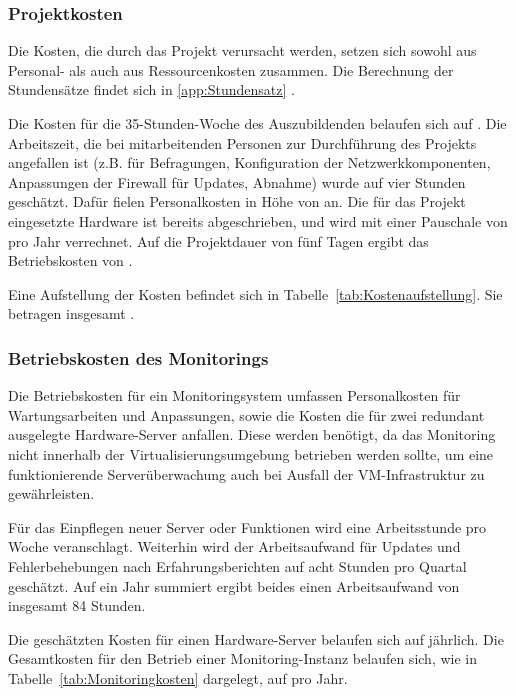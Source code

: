 \subsubsection{Projektkosten}
\label{sec:Projektkosten}
Die Kosten, die durch das Projekt verursacht werden, setzen sich sowohl aus Personal- als auch aus Ressourcenkosten zusammen. Die Berechnung der Stundensätze findet sich in \ref{app:Stundensatz} .

Die Kosten für die 35-Stunden-Woche des Auszubildenden belaufen sich auf . Die Arbeitszeit, die bei mitarbeitenden Personen zur Durchführung des Projekts angefallen ist (z.B. für Befragungen, Konfiguration der Netzwerkkomponenten, Anpassungen der Firewall für Updates, Abnahme) wurde auf vier Stunden geschätzt. Dafür fielen Personalkosten in Höhe von  an. Die für das Projekt eingesetzte Hardware ist bereits abgeschrieben, und wird mit einer Pauschale von  pro Jahr verrechnet. Auf die Projektdauer von fünf Tagen ergibt das Betriebskosten von .

Eine Aufstellung der Kosten befindet sich in Tabelle~\ref{tab:Kostenaufstellung}. Sie betragen insgesamt .

\subsubsection{Betriebskosten des Monitorings}
\label{sec:BetriebskostenMonitoring}
Die Betriebskosten für ein Monitoringsystem umfassen Personalkosten für Wartungsarbeiten und Anpassungen, sowie die Kosten die für zwei redundant ausgelegte Hardware-Server anfallen. Diese werden benötigt, da das Monitoring nicht innerhalb der Virtualisierungsumgebung betrieben werden sollte, um eine funktionierende Serverüberwachung auch bei Ausfall der VM-Infrastruktur zu gewährleisten.

Für das Einpflegen neuer Server oder Funktionen wird eine Arbeitsstunde pro Woche veranschlagt. Weiterhin wird der Arbeitsaufwand für Updates und Fehlerbehebungen nach Erfahrungsberichten auf acht Stunden pro Quartal geschätzt. Auf ein Jahr summiert ergibt beides einen Arbeitsaufwand von insgesamt 84 Stunden.

Die geschätzten Kosten für einen Hardware-Server belaufen sich auf  jährlich. Die Gesamtkosten für den Betrieb einer Monitoring-Instanz belaufen sich, wie in Tabelle~\ref{tab:Monitoringkosten} dargelegt, auf  pro Jahr.

